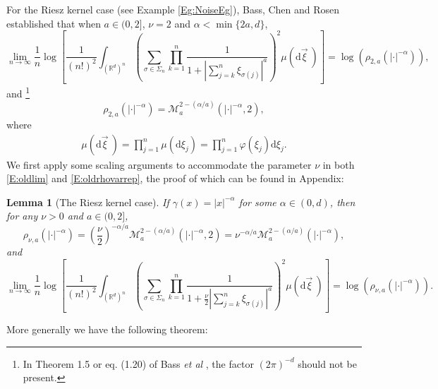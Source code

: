 \documentclass[a4paper,11pt]{article}
\numberwithin{equation}{section}
\numberwithin{equation}{section}
\theoremstyle{plain}
\newtheorem{lemma}[theorem]{Lemma}
\theoremstyle{definition}
\newcommand{\ud}{\ensuremath{\mathrm{d} }}
\newcommand{\R}{\mathbb{R}}
\begin{document}
For the Riesz kernel case (see Example \ref{Eg:NoiseEg}), Bass, Chen and Rosen \cite{BCR09}
established that when $a \in (0,2]$, $\nu = 2$ and $\alpha < \min\{2a,d\}$,
\begin{equation} \label{E:oldlim}
  \lim_{n \to \infty} \frac{1}{n} \log \left[ \frac{1}{(n!)^2} \int_{(\R^d)^n} \left( \sum_{\sigma \in \Sigma_n} \prod_{k=1}^n \frac{1}{1+ |\sum_{j=k}^n \xi_{\sigma(j)}|^a}\right)^2 \mu (\ud \vec{\xi}\:)\right]
  = \log\left( \rho_{2,a}\left(|\cdot|^{-\alpha}\right) \right),
\end{equation}
and \footnote{In Theorem 1.5 or eq. (1.20) of Bass {\it et al} \cite{BCR09}, the factor
$(2\pi)^{-d}$ should not be present.}
\begin{equation} \label{E:oldrhovarrep}
  \rho_{2,a} \left(|\cdot|^{-\alpha}\right) = \mathcal{M}_a^{2-(\alpha/a)}\left(|\cdot|^{-\alpha},2\right),
\end{equation}
where
\begin{align} \label{E:muvec}
  \mu(\ud \vec{\xi}\:) = \prod_{j=1}^n \mu(\ud \xi_j)= \prod_{j=1}^n \varphi(\xi_j) \ud \xi_j.
\end{align}
We first apply some scaling arguments to accommodate the parameter $\nu$ in both \eqref{E:oldlim}
and \eqref{E:oldrhovarrep}, the proof of which can be found in Appendix:

\begin{lemma}[The Riesz kernel case] \label{L:rhovar}
  If $\gamma(x) = |x|^{-\alpha}$ for some $\alpha \in (0,d)$, then for any $\nu >0 $ and $a \in
  (0,2]$,
  \begin{equation} \label{E:rhoLam}
    \rho_{\nu, a}\left(|\cdot|^{-\alpha}\right) = \left(\frac{\nu}{2}\right)^{-\alpha/a} \mathcal{M}_a^{2-(\alpha/a)}\left(|\cdot|^{-\alpha},2\right)
    = \nu^{-\alpha / a}\mathcal{M}_a^{2-(\alpha / a)}(|\cdot|^{-\alpha}),
  \end{equation}
  and
  \begin{equation} \label{E:LogRhoRiez}
    \lim_{n \to \infty} \frac{1}{n} \log \left[ \frac{1}{(n!)^2} \int_{(\R^d)^n} \left( \sum_{\sigma \in \Sigma_n} \prod_{k=1}^n \frac{1}{1+ \frac{\nu}{2}|\sum_{j=k}^n \xi_{\sigma(j)}|^a}\right)^2 \mu (\ud \vec{\xi}\:)\right]
    = \log\left( \rho_{\nu, a}\left(|\cdot|^{-\alpha}\right) \right).
  \end{equation}
\end{lemma}

More generally we have the following theorem:
\end{document}
